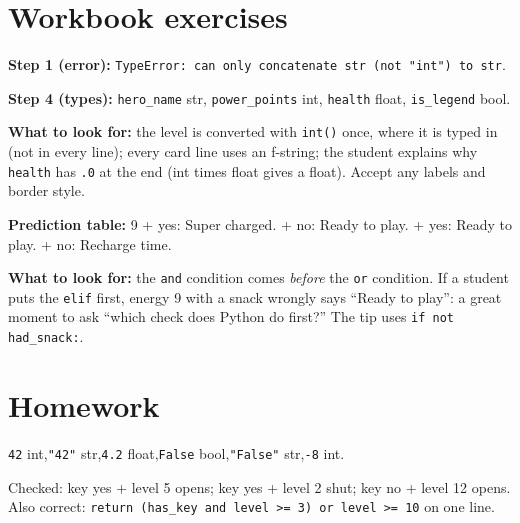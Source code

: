
\section{Workbook exercises}
\begin{answer}
\textbf{Step 1 (error):} \texttt{TypeError: can only concatenate str (not "int") to str}.\par
\textbf{Step 4 (types):} \texttt{hero\_name} str, \texttt{power\_points} int, \texttt{health} float, \texttt{is\_legend} bool.\par
\textbf{What to look for:} the level is converted with \texttt{int()} once, where it is typed in (not in every line);
every card line uses an f-string; the student explains why \texttt{health} has \texttt{.0} at the end (int times float gives a float).
Accept any labels and border style.
\end{answer}

\begin{answer}
\textbf{Prediction table:} 9 + yes: Super charged. + no: Ready to play. + yes: Ready to play. + no: Recharge time.\par
\textbf{What to look for:} the \texttt{and} condition comes \emph{before} the \texttt{or} condition. If a student puts the
\texttt{elif} first, energy 9 with a snack wrongly says \enquote{Ready to play}: a great moment to ask
\enquote{which check does Python do first?} The tip uses \texttt{if not had\_snack:}.
\end{answer}

\section{Homework}
\begin{answer}
\texttt{42} int,\quad \texttt{"42"} str,\quad \texttt{4.2} float,\quad \texttt{False} bool,\quad \texttt{"False"} str,\quad \texttt{-8} int.
\end{answer}

\begin{answer}
Checked: key yes + level 5 opens; key yes + level 2 shut; key no + level 12 opens.
Also correct: \texttt{return (has\_key and level >= 3) or level >= 10} on one line.
\end{answer}

